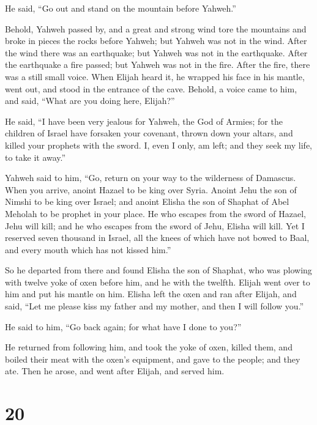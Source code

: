  He said, ``Go out and stand on the mountain before
Yahweh.''

Behold, Yahweh passed by, and a great and strong wind tore the mountains
and broke in pieces the rocks before Yahweh; but Yahweh was not in the
wind. After the wind there was an earthquake; but Yahweh was not in the
earthquake.  After the earthquake a fire passed; but Yahweh
was not in the fire. After the fire, there was a still small voice.
 When Elijah heard it, he wrapped his face in his mantle,
went out, and stood in the entrance of the cave. Behold, a voice came to
him, and said, ``What are you doing here, Elijah?''

 He said, ``I have been very jealous for Yahweh, the God of
Armies; for the children of Israel have forsaken your covenant, thrown
down your altars, and killed your prophets with the sword. I, even I
only, am left; and they seek my life, to take it away.''

 Yahweh said to him, ``Go, return on your way to the
wilderness of Damascus. When you arrive, anoint Hazael to be king over
Syria.  Anoint Jehu the son of Nimshi to be king over
Israel; and anoint Elisha the son of Shaphat of Abel Meholah to be
prophet in your place.  He who escapes from the sword of
Hazael, Jehu will kill; and he who escapes from the sword of Jehu,
Elisha will kill.  Yet I reserved seven thousand in Israel,
all the knees of which have not bowed to Baal, and every mouth which has
not kissed him.''

 So he departed from there and found Elisha the son of
Shaphat, who was plowing with twelve yoke of oxen before him, and he
with the twelfth. Elijah went over to him and put his mantle on him.
 Elisha left the oxen and ran after Elijah, and said, ``Let
me please kiss my father and my mother, and then I will follow you.''

He said to him, ``Go back again; for what have I done to you?''

 He returned from following him, and took the yoke of oxen,
killed them, and boiled their meat with the oxen's equipment, and gave
to the people; and they ate. Then he arose, and went after Elijah, and
served him.

\hypertarget{section-19}{%
\section{20}\label{section-19}}

